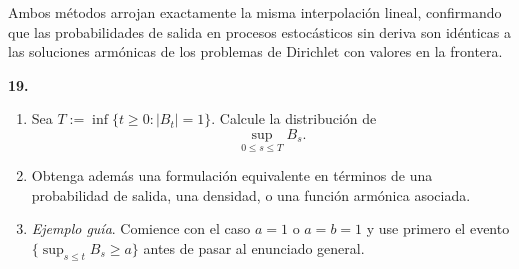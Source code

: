 \documentclass[11pt, letterpaper]{article}
\begin{document}
\begin{solucion}
    Ambos métodos arrojan exactamente la misma interpolación lineal, confirmando que las probabilidades de salida en procesos estocásticos sin deriva son idénticas a las soluciones armónicas de los problemas de Dirichlet con valores en la frontera.
\end{solucion}


\newpage

\begin{ejercicio}
    \textbf{19.} 
    \begin{enumerate}
        \item Sea $T := \inf\{t \ge 0 : |B_t| = 1\}$. Calcule la distribución de
        \[ \sup_{0 \le s \le T} B_s. \]
        \item Obtenga además una formulación equivalente en términos de una probabilidad de salida, una densidad, o una función armónica asociada.
        \item \textit{Ejemplo guía}. Comience con el caso $a = 1$ o $a = b = 1$ y use primero el evento $\{\sup_{s \le t} B_s \ge a\}$ antes de pasar al enunciado general.
    \end{enumerate}
\end{ejercicio}

\vspace{5mm}
\end{document}
